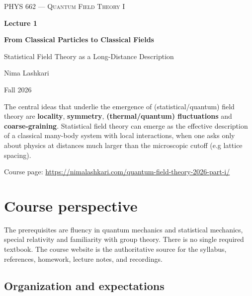 \documentclass[11pt]{article}
\begin{document}

\begin{titlepage}
\centering
\vspace*{1.2in}
{\scshape\Large PHYS 662 --- Quantum Field Theory I\par}
\vspace{0.35in}
{\Huge\bfseries\color{qftblue} Lecture 1\par}
\vspace{0.15in}
{\LARGE\bfseries From Classical Particles to Classical Fields\par}
\vspace{0.12in}
{\Large\color{qftgreen} Statistical Field Theory as a Long-Distance Description\par}
\vspace{0.6in}
{\large Nima Lashkari\par}
{\large Fall 2026\par}
\vfill
\begin{minipage}{0.86\textwidth}
\small
The central ideas that underlie the emergence of (statistical/quantum) field theory are {\bf locality}, {\bf symmetry}, {\bf (thermal/quantum) fluctuations} and {\bf coarse-graining}.
Statistical field theory can emerge as the effective description of a classical many-body system with local interactions, when one asks only about physics at distances much larger than the microscopic cutoff (e.g lattice spacing). 

\medskip
Course page: \url{https://nimalashkari.com/quantum-field-theory-2026-part-i/}
\end{minipage}
\vspace{0.5in}
\end{titlepage}

\tableofcontents
\newpage
{}

\section*{Course perspective}

The prerequisites are fluency in quantum mechanics and statistical mechanics, special relativity and familiarity with group theory.  There is no single required textbook.  The course website is the authoritative source for the syllabus, references, homework, lecture notes, and recordings.

\subsection*{Organization and expectations}
\end{document}
